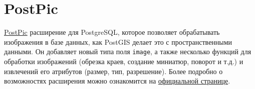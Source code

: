 \section{PostPic}

\href{http://drotiro.github.io/postpic/}{PostPic} расширение для PostgreSQL, которое позволяет обрабатывать изображения в базе данных, как PostGIS делает это с пространственными данными. Он добавляет новый типа поля \lstinline!image!, а также несколько функций для обработки изображений (обрезка краев, создание миниатюр, поворот и т.д.) и извлечений его атрибутов (размер, тип, разрешение). Более подробно о возможностях расширения можно ознакомится на \href{https://github.com/drotiro/postpic/wiki/SQL-Functions-Guide}{официальной странице}.
